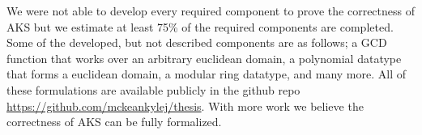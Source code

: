 \documentclass[./Thesis.tex]{subfiles}
\begin{document}
We were not able to develop every required component to prove the
correctness of AKS but we estimate at least 75\% of the required components are
completed. Some of the developed, but not described components are as follows; a
GCD function that works over an arbitrary euclidean domain, a polynomial
datatype that forms a euclidean domain, a modular ring datatype, and many more.
All of these formulations are available publicly in the github repo
\url{https://github.com/mckeankylej/thesis}. With more work we believe the
correctness of AKS can be fully formalized.
\end{document}
